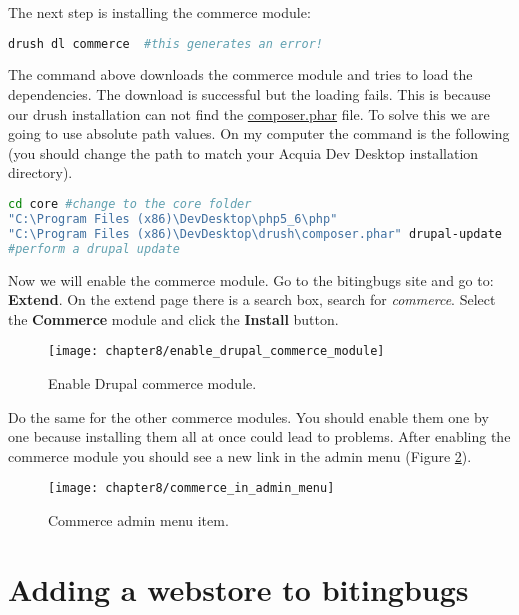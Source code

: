 The next step is installing the commerce module:

\begin{lstlisting}[language=bash]
drush dl commerce  #this generates an error!
\end{lstlisting}

The command above downloads the commerce module and tries to load the dependencies. The download is successful but the loading fails. This is because our drush installation can not find the \url{composer.phar} file. To solve this we are going to use absolute path values. On my computer the command is the following (you should change the path to match your Acquia Dev Desktop installation directory).

\begin{lstlisting}[language=bash]
cd core #change to the core folder
"C:\Program Files (x86)\DevDesktop\php5_6\php"
"C:\Program Files (x86)\DevDesktop\drush\composer.phar" drupal-update 
#perform a drupal update
\end{lstlisting}

Now we will enable the commerce module. Go to the bitingbugs site and go to: \textbf{Extend}. On the extend page there is a search box, search for \textit{commerce}. Select the \textbf{Commerce} module and click the \textbf{Install} button.

\begin{figure}[H]
	\centering
	\texttt{[image: chapter8/enable\_drupal\_commerce\_module]}
	\caption{Enable Drupal commerce module.}
	\label{fig:enable_drupal_commerce_module}
\end{figure}

Do the same for the other commerce modules. You should enable them one by one because installing them all at once could lead to problems. After enabling the commerce module you should see a new link in the admin menu (Figure \ref{fig:commerce_in_admin_menu}).

\begin{figure}[H]
	\centering
	\texttt{[image: chapter8/commerce\_in\_admin\_menu]}
	\caption{Commerce admin menu item.}
	\label{fig:commerce_in_admin_menu}
\end{figure}


\section{Adding a webstore to bitingbugs}





